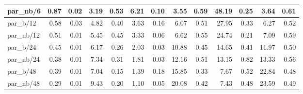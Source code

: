 \begin{tabular}{|lllllllllllll|}
\multicolumn{1}{|l|}{par\_nb/6}  & \multicolumn{1}{r|}{0.87} & \multicolumn{1}{r|}{0.02} & \multicolumn{1}{r|}{3.19} & \multicolumn{1}{r|}{0.53}  & \multicolumn{1}{r|}{6.21} & \multicolumn{1}{r|}{0.10} & \multicolumn{1}{r|}{3.55} & \multicolumn{1}{r|}{0.59}  & \multicolumn{1}{r|}{48.19} & \multicolumn{1}{r|}{0.25} & \multicolumn{1}{r|}{3.64} & \multicolumn{1}{r|}{0.61}  \\ \hline
\multicolumn{1}{|l|}{par\_b/12}  & \multicolumn{1}{r|}{0.58} & \multicolumn{1}{r|}{0.03} & \multicolumn{1}{r|}{4.82} & \multicolumn{1}{r|}{0.40}  & \multicolumn{1}{r|}{3.63} & \multicolumn{1}{r|}{0.16} & \multicolumn{1}{r|}{6.07} & \multicolumn{1}{r|}{0.51}  & \multicolumn{1}{r|}{27.95} & \multicolumn{1}{r|}{0.33} & \multicolumn{1}{r|}{6.27} & \multicolumn{1}{r|}{0.52}  \\ \hline
\multicolumn{1}{|l|}{par\_nb/12}  & \multicolumn{1}{r|}{0.51} & \multicolumn{1}{r|}{0.01} & \multicolumn{1}{r|}{5.45} & \multicolumn{1}{r|}{0.45}  & \multicolumn{1}{r|}{3.33} & \multicolumn{1}{r|}{0.06} & \multicolumn{1}{r|}{6.62} & \multicolumn{1}{r|}{0.55}  & \multicolumn{1}{r|}{24.74} & \multicolumn{1}{r|}{0.21} & \multicolumn{1}{r|}{7.09} & \multicolumn{1}{r|}{0.59}  \\ \hline
\multicolumn{1}{|l|}{par\_b/24}  & \multicolumn{1}{r|}{0.45} & \multicolumn{1}{r|}{0.01} & \multicolumn{1}{r|}{6.17} & \multicolumn{1}{r|}{0.26}  & \multicolumn{1}{r|}{2.03} & \multicolumn{1}{r|}{0.03} & \multicolumn{1}{r|}{10.88} & \multicolumn{1}{r|}{0.45}  & \multicolumn{1}{r|}{14.65} & \multicolumn{1}{r|}{0.41} & \multicolumn{1}{r|}{11.97} & \multicolumn{1}{r|}{0.50}  \\ \hline
\multicolumn{1}{|l|}{par\_nb/24}  & \multicolumn{1}{r|}{0.38} & \multicolumn{1}{r|}{0.01} & \multicolumn{1}{r|}{7.34} & \multicolumn{1}{r|}{0.31}  & \multicolumn{1}{r|}{1.81} & \multicolumn{1}{r|}{0.03} & \multicolumn{1}{r|}{12.16} & \multicolumn{1}{r|}{0.51}  & \multicolumn{1}{r|}{13.15} & \multicolumn{1}{r|}{0.82} & \multicolumn{1}{r|}{13.33} & \multicolumn{1}{r|}{0.56}  \\ \hline
\multicolumn{1}{|l|}{par\_b/48}  & \multicolumn{1}{r|}{0.39} & \multicolumn{1}{r|}{0.01} & \multicolumn{1}{r|}{7.04} & \multicolumn{1}{r|}{0.15}  & \multicolumn{1}{r|}{1.39} & \multicolumn{1}{r|}{0.18} & \multicolumn{1}{r|}{15.85} & \multicolumn{1}{r|}{0.33}  & \multicolumn{1}{r|}{7.67} & \multicolumn{1}{r|}{0.52} & \multicolumn{1}{r|}{22.84} & \multicolumn{1}{r|}{0.48}  \\ \hline
\multicolumn{1}{|l|}{par\_nb/48}  & \multicolumn{1}{r|}{0.29} & \multicolumn{1}{r|}{0.01} & \multicolumn{1}{r|}{9.43} & \multicolumn{1}{r|}{0.20}  & \multicolumn{1}{r|}{1.10} & \multicolumn{1}{r|}{0.05} & \multicolumn{1}{r|}{20.08} & \multicolumn{1}{r|}{0.42}  & \multicolumn{1}{r|}{7.43} & \multicolumn{1}{r|}{0.48} & \multicolumn{1}{r|}{23.59} & \multicolumn{1}{r|}{0.49}  \\ \hline

\end{tabular}
